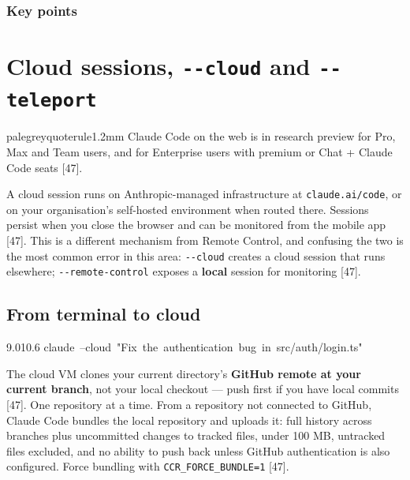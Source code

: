 \documentclass[11pt,a4paper,twoside,openany]{book}
\newcommand{\chaptertitlelabel}{}
\newcommand{\cl}[1]{\noindent\mbox{#1}\par}
\begin{document}
  \subsection*{Key points}
  \begin{itemize}\kprows\end{itemize}
\else
  \noindent\kpbody
\fi
\par\addvspace{1.4mm}
\endgroup

\FloatBarrier
\renewcommand{\chaptertitlelabel}{Part VI \textperiodcentered\ Chapter 26}
\setcounter{chapter}{25}
\chapter{Cloud sessions, \texttt{-\allowbreak{}-\allowbreak{}cloud} and \texttt{-\allowbreak{}-\allowbreak{}teleport}}

\begin{calloutbox}{palegrey}{quoterule}{1.2mm}
Claude Code on the web is in research preview for Pro, Max and Team users, and for Enterprise users with premium or Chat + Claude Code seats [47].
\end{calloutbox}

A cloud session runs on Anthropic-managed infrastructure at \texttt{claude.\allowbreak{}ai/\allowbreak{}code}, or on your organisation's self-hosted environment when routed there. Sessions persist when you close the browser and can be monitored from the mobile app [47]. This is a different mechanism from Remote Control, and confusing the two is the most common error in this area: \texttt{-\allowbreak{}-\allowbreak{}cloud} creates a cloud session that runs elsewhere; \texttt{-\allowbreak{}-\allowbreak{}remote-\allowbreak{}control} exposes a \textbf{local} session for monitoring [47].


\FloatBarrier
\setcounter{section}{0}
\section{From terminal to cloud}

\begin{codeblock}{9.0}{10.6}
\cl{claude~--cloud~"Fix~the~authentication~bug~in~src/auth/login.ts"}
\end{codeblock}

The cloud VM clones your current directory's \textbf{GitHub remote at your current branch}, not your local checkout — push first if you have local commits [47]. One repository at a time. From a repository not connected to GitHub, Claude Code bundles the local repository and uploads it: full history across branches plus uncommitted changes to tracked files, under 100 MB, untracked files excluded, and no ability to push back unless GitHub authentication is also configured. Force bundling with \texttt{CCR\_\allowbreak{}FORCE\_\allowbreak{}BUNDLE=\allowbreak{}1} [47].
\end{document}
